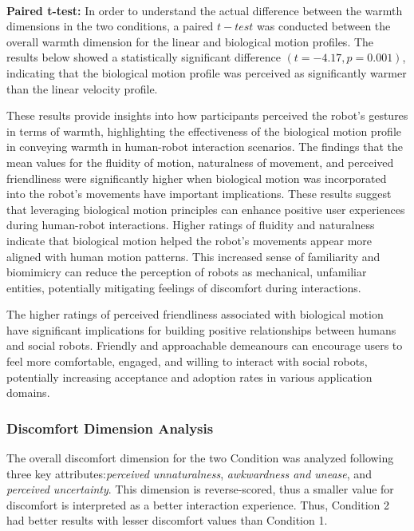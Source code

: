 \documentclass{CSSRforAfrica}
\begin{document}
~\\
\noindent \textbf{Paired t-test:}
In order to understand the actual difference between the warmth dimensions in the two conditions, a paired $t-test$ was conducted between the overall warmth dimension for the linear and biological motion profiles. The results below showed a statistically significant difference $(t = -4.17, p  = 0.001)$, indicating that the biological motion profile was perceived as significantly warmer than the linear velocity profile.
 
These results provide insights into how participants perceived the robot's gestures in terms of warmth, highlighting the effectiveness of the biological motion profile in conveying warmth in human-robot interaction scenarios. The findings that the mean values for the fluidity of motion, naturalness of movement, and perceived friendliness were significantly higher when biological motion was incorporated into the robot's movements have important implications. These results suggest that leveraging biological motion principles can enhance positive user experiences during human-robot interactions. Higher ratings of fluidity and naturalness indicate that biological motion helped the robot's movements appear more aligned with human motion patterns. This increased sense of familiarity and biomimicry can reduce the perception of robots as mechanical, unfamiliar entities, potentially mitigating feelings of discomfort during interactions. 

The higher ratings of perceived friendliness associated with biological motion have significant implications for building positive relationships between humans and social robots. Friendly and approachable demeanours can encourage users to feel more comfortable, engaged, and willing to interact with social robots, potentially increasing acceptance and adoption rates in various application domains.


\subsubsection{Discomfort Dimension Analysis}
The overall discomfort dimension for the two Condition was analyzed following three key attributes:{\em perceived unnaturalness}, {\em awkwardness and unease}, and {\em perceived uncertainty}. This dimension is reverse-scored, thus a smaller value for discomfort is interpreted as a better interaction experience. Thus, Condition 2 had better results with lesser discomfort values than Condition 1. 
\end{document}
